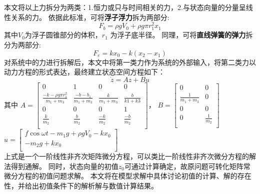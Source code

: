 \documentclass[withoutpreface,bwprint]{cumcmthesis} %
\begin{document}
    本文将以上力拆分为两类：1.恒力或只与时间相关的力，2.与状态向量的分量呈线性关系的力。
    依据此标准，可将\textbf{浮子浮力}拆为两部分:
    \begin{equation}
        F_b = \rho g V_0 + \rho g \pi r_1^2 x_1
        \label{eq:split_b}
    \end{equation} 其中$V_0$为浮子圆锥部分的体积，$r_1$ 为浮子底半径。
    同理，可将\textbf{直线弹簧的弹力}拆分为两部分: 
    \begin{equation}
        F_e = k x_0 - k(x_2 - x_1)
        \label{eq:split_e}
    \end{equation} 对系统中的力进行拆解后，本文中将第一类力作为系统的外部输入，将第二类力以动力方程的形式表达，最终建立状态空间方程如下：
    \begin{equation}
        \dot{z}= Az + Bu
        \label{eq:space}
    \end{equation}
    其中 $
        A = \left [
        \begin{array}{cccc}
            0 & 1 & 0 & 0 \\
            \frac{-k -\rho g \pi r_1^2}{m_1 + m_3} & \frac{- b - b_1}{m_1 + m_3} & \frac{k}{m_1 + m_3} & \frac{b}{k1 + k3}\\
            0 & 0 & 0 & 1 \\
            \frac{k}{m_2}& \frac{b}{m_2} & \frac{-k}{m_2} & \frac{-b}{m_2}\\
        \end{array} \right ]
        $，
        $
        B = \left [
        \begin{array}{cc}
        0&0\\
        \frac{1}{m_1 + m_3}&0\\
        0&0\\
        0&\frac{1}{m_2}\\
        \end{array} \right ]
        $ \\
        $
        u = \left [
        \begin{array}{c}
        f\cos \omega t - m_1 g + \rho g V_0 - k x_0\\
        -m_2 g + k x_0 \\
        \end{array} \right ]
        $ \\
    上式是一个一阶线性非齐次矩阵微分方程，可以类比一阶线性非齐次微分方程的解法得到通解。
    同时，状态向量的初值$ z_0 $可通过计算确定，故原问题可转化矩阵常微分方程的初值问题求解。
    本文将在模型求解中具体讨论初值的计算、解的存在性，并给出初值条件下的解析解与数值计算结果。
\end{document}
